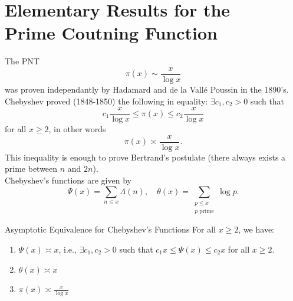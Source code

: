 \documentclass[twoside, openright, fontsize=10pt, headings=big]{scrbook}
\begin{document}
\chapter{Elementary Results for the \\Prime Coutning Function}
The PNT 
\[
    \pi(x)\sim\frac{x}{\log x}
\]
was proven independantly by Hadamard and de la Vall\'{e} Poussin in the 1890's. Chebyshev proved (1848-1850) the following in equality: $\exists c_1,c_2>0$ such that
\[
    c_1\frac{x}{\log x}\leq \pi(x)\leq c_2\frac{x}{\log x}    
\]
for all $x\geq 2$, in other words
\[
    \pi(x)\asymp\frac{x}{\log x}.
\]
This inequality is enough to prove Bertrand's postulate (there always exists a prime between $n$ and $2n$).\\
Chebyshev's functions are given by
\[
    \Psi(x)=\sum_{n\leq x}\Lambda(n),\quad \theta(x)=\sum_{\substack{p\leq x\\p \text{ prime}}}\log p.
\]
\begin{theorem}{Asymptotic Equivalence for Chebyshev's Functions}{}
    For all $x\geq2$, we have:
    \begin{enumerate}
        \item $\Psi(x)\asymp x$, i.e., $\exists c_1,c_2>0$ such that $c_1x\leq \Psi(x)\leq c_2x$ for all $x\geq2$.
        \item $\theta(x)\asymp x$
        \item $\pi(x)\asymp\frac{x}{\log x}$
    \end{enumerate}
\end{theorem}
\end{document}
